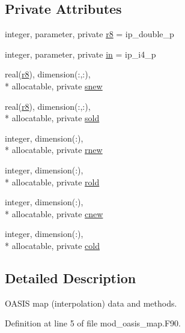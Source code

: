 \subsection*{Private Attributes}
\begin{DoxyCompactItemize}
\item 
integer, parameter, private \hyperlink{classmod__oasis__map_a30ebe320b9e4c06a1ee1f2a0bbacf2c4}{r8} = ip\+\_\+double\+\_\+p
\item 
integer, parameter, private \hyperlink{classmod__oasis__map_aa58997467050224f6db2bc93fe5f7ca1}{in} = ip\+\_\+i4\+\_\+p
\item 
real(\hyperlink{classmod__oasis__map_a30ebe320b9e4c06a1ee1f2a0bbacf2c4}{r8}), dimension(\+:,\+:), \\*
allocatable, private \hyperlink{classmod__oasis__map_a28b59479c467c58995c6300071ca140a}{snew}
\item 
real(\hyperlink{classmod__oasis__map_a30ebe320b9e4c06a1ee1f2a0bbacf2c4}{r8}), dimension(\+:,\+:), \\*
allocatable, private \hyperlink{classmod__oasis__map_a1fc7e7f295910352524d442c5d0dbf79}{sold}
\item 
integer, dimension(\+:), \\*
allocatable, private \hyperlink{classmod__oasis__map_a2575785d3ea5e1a37c7f6303f00eb727}{rnew}
\item 
integer, dimension(\+:), \\*
allocatable, private \hyperlink{classmod__oasis__map_a2931a6f582d0173cc0e6b155b8cb55b7}{rold}
\item 
integer, dimension(\+:), \\*
allocatable, private \hyperlink{classmod__oasis__map_a8ae737bd62499fe60ebb48d04ad3b6dd}{cnew}
\item 
integer, dimension(\+:), \\*
allocatable, private \hyperlink{classmod__oasis__map_a479ecc5b0be5d1adf3973cb08c40d30a}{cold}
\end{DoxyCompactItemize}


\subsection{Detailed Description}
O\+A\+S\+I\+S map (interpolation) data and methods. 

Definition at line 5 of file mod\+\_\+oasis\+\_\+map.\+F90.



